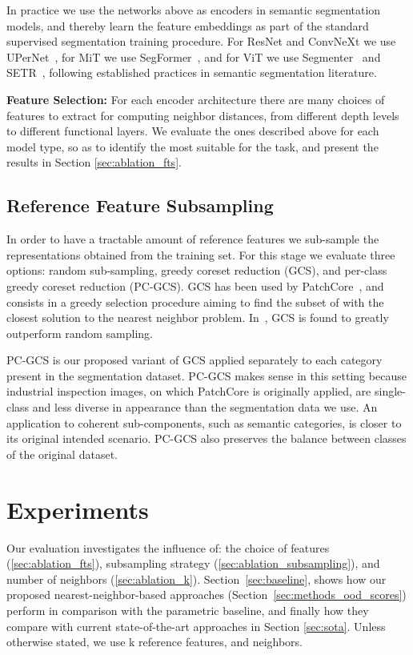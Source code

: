 \documentclass[10pt,twocolumn,letterpaper]{article}
\begin{document}
In practice we use the networks above as encoders in semantic segmentation models, and thereby learn the feature embeddings as part of the standard supervised segmentation training procedure.
For ResNet and ConvNeXt we use UPerNet~\cite{xiao2018unified}, for MiT we use SegFormer~\cite{xie2021segformer}, and for ViT we use Segmenter~\cite{strudel2021segmenter} and SETR~\cite{zheng2021rethinking}, following established practices in semantic segmentation literature.

\textbf{Feature Selection:}
\label{sec:method_feature_selection}
For each encoder architecture there are many choices of features to extract for computing neighbor distances, from different depth levels to different functional layers. We evaluate the ones described above for each model type, so as to identify the most suitable for the task, and present the results in Section \ref{sec:ablation_fts}.

\subsection{Reference Feature Subsampling}
\label{sec:method_subsampling}
In order to have a tractable amount of reference features we sub-sample the representations obtained from the training set.
For this stage we evaluate three options: random sub-sampling, greedy coreset reduction (GCS), and per-class greedy coreset reduction (PC-GCS). GCS has been used by PatchCore~\cite{patchcore}, and consists in a 
greedy selection procedure aiming to find the subset of  with the closest solution to the nearest neighbor problem.
In~\cite{patchcore}, GCS is found to greatly outperform random sampling.

PC-GCS is our proposed variant of GCS applied separately to each category present in the segmentation dataset. PC-GCS makes sense in this setting because industrial inspection images, on which PatchCore is originally applied, are single-class and less diverse in appearance than the segmentation data we use. An application to coherent sub-components, such as semantic categories, is closer to its original intended scenario. PC-GCS also preserves the balance between classes of the original dataset.


 \section{Experiments}
\label{sec:experiments}
Our evaluation investigates the influence of: the choice of features (\ref{sec:ablation_fts}), subsampling strategy (\ref{sec:ablation_subsampling}), and number of neighbors (\ref{sec:ablation_k}). Section~\ref{sec:baseline}, shows how our proposed nearest-neighbor-based approaches (Section~\ref{sec:methods_ood_scores}) perform in comparison with the parametric baseline, and finally how they compare with current state-of-the-art approaches in Section \ref{sec:sota}. 
Unless otherwise stated, we use k reference features, and  neighbors.
\end{document}
